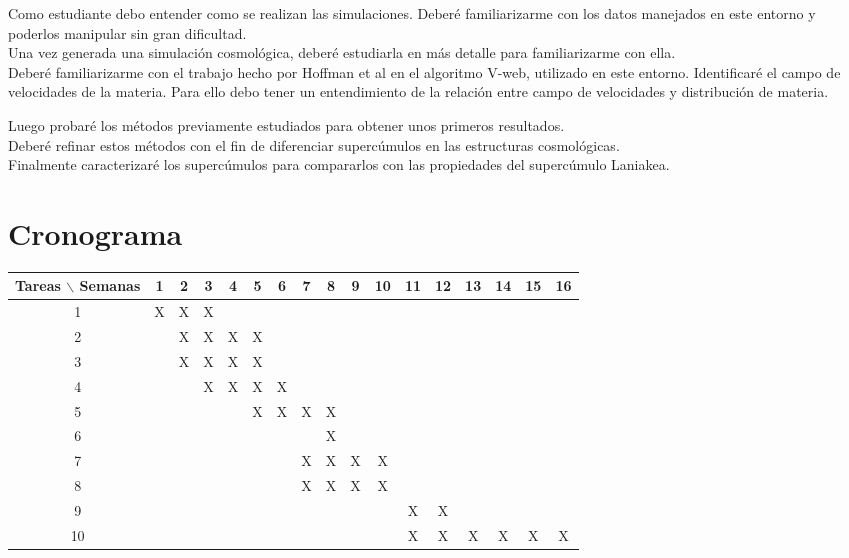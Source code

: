 \documentclass[12pt]{article}
\begin{document}
Como estudiante debo entender como se realizan las
simulaciones. Deber\'{e} familiarizarme con los datos manejados en
este entorno y poderlos manipular sin gran dificultad.
\\

Una vez generada una simulaci\'on cosmol\'{o}gica, 
deber\'{e} estudiarla en m\'{a}s detalle para familiarizarme con
ella.
\\
Deber\'{e} familiarizarme con el trabajo hecho por Hoffman et al\cite{hoffman_kinematic_2012} en el algoritmo V-web, utilizado en este entorno. Identificar\'{e} el campo de velocidades de la materia. Para ello debo tener un entendimiento de la relaci\'{o}n entre campo de velocidades  y distribuci\'{o}n de materia. 

Luego probar\'{e} los m\'{e}todos previamente estudiados para obtener unos
primeros resultados.  
\\

Deber\'{e} refinar estos m\'{e}todos con el fin de diferenciar
superc\'{u}mulos en las estructuras cosmol\'{o}gicas. 
\\

Finalmente caracterizar\'{e} los superc\'umulos para compararlos con las
propiedades del superc\'umulo Laniakea.

\section{Cronograma}

\begin{table}[htb]
	\begin{tabular}{|c|cccccccccccccccc| }
	\hline
	Tareas $\backslash$ Semanas & 1 & 2 & 3 & 4 & 5 & 6 & 7 & 8 & 9 & 10 & 11 & 12 & 13 & 14 & 15 & 16  \\
	\hline
	1 & X & X & X &   &   &   &   &   &   &   &   &   &   &   &   &   \\
	2 &   & X & X & X & X &   &   &   &   &   &   &   &   &   &   &   \\
	3 &   & X & X & X & X &   &   &   &   &   &   &   &   &   &   &   \\
	4 &   &   & X & X & X & X &   &   &   &   &   &   &   &   &   &   \\
	5 &   &   &   &   & X & X & X & X &  &  &   &   &   &   &   &   \\
	6 &   &   &   &   &   &   &  & X &  &  &   &   &   &   &   &   \\
	7 &   &   &   &   &   &   & X & X & X & X & & & &  & & \\  
	8 &   &   &   &   &   &   & X & X & X & X &  &  & & & &  \\
    9 &   &   &   &   &   &   &  &  &  &  & X & X &   &   &   &   \\
	10 &   &   &   &   &   &   &  &  &  &  & X & X  & X  & X  & X  & X \\
	\hline
	\end{tabular}
\end{table}
\vspace{1mm}
\FloatBarrier
\end{document}
